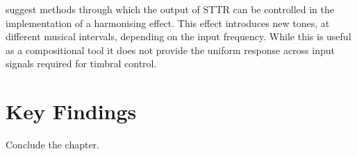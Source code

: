 			\citet{kim2015harmonizing} suggest methods through which the output of STTR can be controlled in
			the implementation of a harmonising effect. This effect introduces new tones, at different
			musical intervals, depending on the input frequency. While this is useful as a compositional tool
			it does not provide the uniform response across input signals required for timbral control.

\section{Key Findings}
	\note
	{
		Conclude the chapter.
	}
